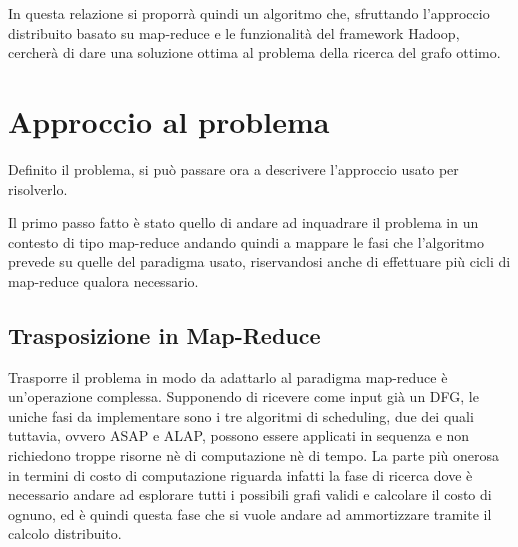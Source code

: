 \documentclass[]{IEEEtran}
\begin{document}
In questa relazione si proporrà quindi un algoritmo che, sfruttando l'approccio distribuito basato su map-reduce e le funzionalità del framework Hadoop, cercherà di dare una soluzione ottima al problema della ricerca del grafo ottimo.
\section{Approccio al problema}
Definito il problema, si può passare ora a descrivere l'approccio usato per risolverlo.

Il primo passo fatto è stato quello di andare ad inquadrare il problema in un contesto di tipo map-reduce andando quindi a mappare le fasi che l'algoritmo prevede su quelle del paradigma usato, riservandosi anche di effettuare più cicli di map-reduce qualora necessario.
\subsection{Trasposizione in Map-Reduce}
Trasporre il problema in modo da adattarlo al paradigma map-reduce  è un'operazione complessa. Supponendo di ricevere come input già un DFG, le uniche fasi da implementare sono i tre algoritmi di scheduling, due dei quali tuttavia, ovvero ASAP e ALAP, possono essere applicati in sequenza e non richiedono troppe risorne nè di computazione nè di tempo. La parte più onerosa in termini di costo di computazione riguarda infatti la fase di ricerca dove è necessario andare ad esplorare tutti i possibili grafi validi e calcolare il costo di ognuno, ed è quindi questa fase che si vuole andare ad ammortizzare tramite il calcolo distribuito. 
\end{document}
